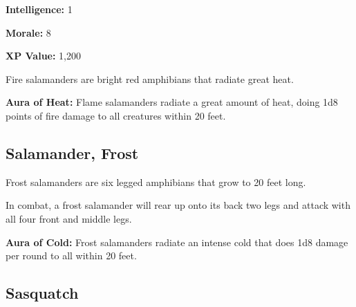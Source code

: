 \begin{multicols*}{2}
{\textbf{Intelligence:} 1

\textbf{Morale:} 8

\textbf{XP Value:} 1,200}

Fire salamanders are bright red amphibians that radiate great heat.

\textbf{Aura of Heat:} Flame salamanders radiate a great amount of heat, doing 1d8 points of fire damage to all creatures within 20 feet.

\subsection{Salamander, Frost}

Frost salamanders are six legged amphibians that grow to 20 feet long.

In combat, a frost salamander will rear up onto its back two legs and attack with all four front and middle legs.

\textbf{Aura of Cold:} Frost salamanders radiate an intense cold that does 1d8 damage per round to all within 20 feet.

\subsection{Sasquatch}
\end{multicols*}
